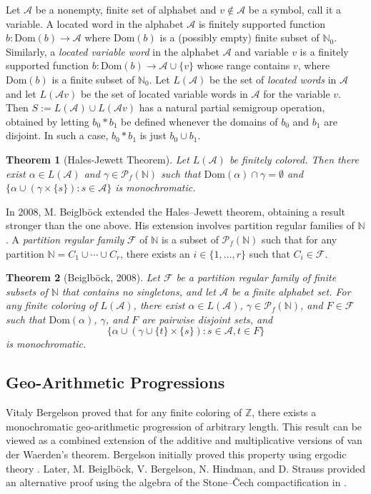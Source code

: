 \documentclass[12pt]{amsart}
\theoremstyle{plain}
\newtheorem{theorem}{Theorem}[section]
\theoremstyle{definition}
\theoremstyle{remark}
\numberwithin{equation}{section}
\newcommand{\Dom}{\mathrm{Dom}}
\newcommand{\cA}{\mathcal{A}}
\begin{document}
 Let $\cA$ be a nonempty, finite set of alphabet and $v \notin \cA$ be a symbol, call it a variable. A located word in the alphabet $\cA$ is finitely supported function $b : \Dom(b) \rightarrow \cA$ where $\Dom(b)$ is a (possibly empty) finite subset of $\mathbb{N}_0.$ Similarly, a \textit{located  variable word } in the alphabet $\cA$ and variable $v$ is a finitely supported function $b : \Dom(b) \rightarrow \cA \cup \{v\}$ whose range contains $v$, where $\Dom(b)$ is a finite subset of $\mathbb{N}_0$. Let $L(\cA)$ be the set of \textit{located words} in $\cA$ and let $L(\cA v)$ be the set of located variable words in $\cA$ for the variable $v.$ Then $S:= L(\cA) \cup L(\cA v)$ has a natural partial semigroup operation, obtained by letting $b_0 \ast b_1$ be defined whenever the domains of $b_0$ and $b_1$ are disjoint. In such a case, $b_0 \ast b_1$ is just $b_0 \cup b_1.$

\begin{theorem}[Hales-Jewett Theorem] 
Let \( L(\mathcal{A}) \) be finitely colored. Then there exist \( \alpha \in L(\mathcal{A}) \) and \( \gamma \in \mathcal{P}_f(\mathbb{N}) \) such that \( \Dom(\alpha) \cap \gamma = \emptyset \) and \( \{\alpha \cup (\gamma \times \{s\}) : s \in \mathcal{A}\} \) is monochromatic.
\end{theorem}

In 2008, M. Beiglb\"{o}ck extended the Hales–Jewett theorem, obtaining a result stronger than the one above. His extension involves partition regular families of \( \mathbb{N} \). A \emph{partition regular family} \( \mathcal{F} \) of \( \mathbb{N} \) is a subset of \( \mathcal{P}_f(\mathbb{N}) \) such that for any partition \( \mathbb{N} = C_1 \cup \cdots \cup C_r \), there exists an \( i \in \{1, \dots, r\} \) such that \( C_i \in \mathcal{F} \).

\begin{theorem}[Beiglb\"{o}ck, 2008] \label{Beiglbock}
Let \( \mathcal{F} \) be a partition regular family of finite subsets of \( \mathbb{N} \) that contains no singletons, and let \( \mathcal{A} \) be a finite alphabet set. For any finite coloring of \( L(\mathcal{A}) \), there exist \( \alpha \in L(\mathcal{A}) \), \( \gamma \in \mathcal{P}_f(\mathbb{N}) \), and \( F \in \mathcal{F} \) such that \( \Dom(\alpha) \), \( \gamma \), and \( F \) are pairwise disjoint sets, and 
\[
\{\alpha \cup (\gamma \cup \{t\} \times \{s\}) : s \in \mathcal{A}, t \in F\}
\]
is monochromatic.
\end{theorem}

\subsection{Geo-Arithmetic Progressions}
Vitaly Bergelson proved that for any finite coloring of \( \mathbb{Z} \), there exists a monochromatic geo-arithmetic progression of arbitrary length. This result can be viewed as a combined extension of the additive and multiplicative versions of van der Waerden's theorem. Bergelson initially proved this property using ergodic theory \cite{Ber05}. Later, M. Beiglb\"{o}ck, V. Bergelson, N. Hindman, and D. Strauss provided an alternative proof using the algebra of the Stone–Čech compactification in \cite{BBHS08}.
\end{document}
